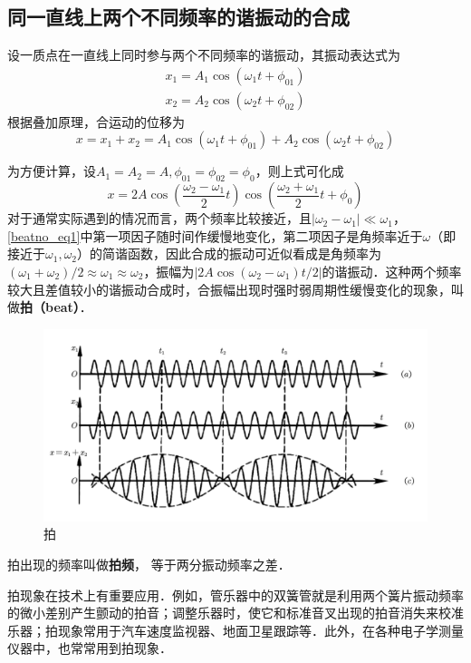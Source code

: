 

\subsection{同一直线上两个不同频率的谐振动的合成}

设一质点在一直线上同时参与两个不同频率的谐振动，其振动表达式为
\begin{equation}
\begin{array}{l}x_{1}=A_{1} \cos \left(\omega_{1} t+\phi_{01}\right) \\ x_{2}=A_{2} \cos \left(\omega_{2} t+\phi_{02}\right)\end{array}
\end{equation}
根据叠加原理，合运动的位移为
\begin{equation}
x=x_{1}+x_{2}=A_{1} \cos \left(\omega_{1} t+\phi_{01}\right)+A_{2} \cos \left(\omega_{2} t+\phi_{02}\right)
\end{equation}

为方便计算，设$A_1=A_2=A,\phi_{01}=\phi_{02}=\phi_{0}$，则上式可化成
\begin{equation} \label{beatno_eq1}
x=2 A \cos \left(\frac{\omega_{2}-\omega_{1}}{2} t\right) \cos \left(\frac{\omega_{2}+\omega_{1}}{2} t+\phi_{0}\right)
\end{equation}
对于通常实际遇到的情况而言，两个频率比较接近，且$\left|\omega_{2}-\omega_{1}\right|\ll \omega_1$，\autoref{beatno_eq1}中第一项因子随时间作缓慢地变化，第二项因子是角频率近于$\omega$（即接近于$\omega_1,\omega_2$）的简谐函数，因此合成的振动可近似看成是角频率为$(\omega_{1}+\omega_{2})/2 \approx \omega_{1} \approx \omega_{2}$，振幅为$\left | 2 A \cos (\omega_{2}-\omega_{1})t/{2} \right |$的谐振动．这种两个频率较大且差值较小的谐振动合成时，合振幅出现时强时弱周期性缓慢变化的现象，叫做\textbf{拍（beat）}．

\begin{figure}[ht]
\centering
\includegraphics[width=13cm]{./figures/beatno_1.png}
\caption{拍} \label{beatno_fig1}
\end{figure}

拍出现的频率叫做\textbf{拍频}， 等于两分振动频率之差．

拍现象在技术上有重要应用．例如，管乐器中的双簧管就是利用两个簧片振动频率的微小差别产生颤动的拍音；调整乐器时，使它和标准音叉出现的拍音消失来校准乐器；拍现象常用于汽车速度监视器、地面卫星跟踪等．此外，在各种电子学测量仪器中，也常常用到拍现象．